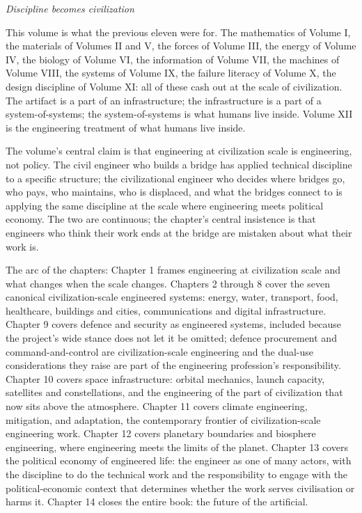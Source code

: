 
\vspace*{1.5cm}
\begin{center}
\itshape\large
Discipline becomes civilization
\end{center}
\vspace{0.5cm}

\noindent
This volume is what the previous eleven were for. The mathematics of Volume I, the materials of Volumes II and V, the forces of Volume III, the energy of Volume IV, the biology of Volume VI, the information of Volume VII, the machines of Volume VIII, the systems of Volume IX, the failure literacy of Volume X, the design discipline of Volume XI: all of these cash out at the scale of civilization. The artifact is a part of an infrastructure; the infrastructure is a part of a system-of-systems; the system-of-systems is what humans live inside. Volume XII is the engineering treatment of what humans live inside.

The volume's central claim is that engineering at civilization scale is engineering, not policy. The civil engineer who builds a bridge has applied technical discipline to a specific structure; the civilizational engineer who decides where bridges go, who pays, who maintains, who is displaced, and what the bridges connect to is applying the same discipline at the scale where engineering meets political economy. The two are continuous; the chapter's central insistence is that engineers who think their work ends at the bridge are mistaken about what their work is.

The arc of the chapters: Chapter 1 frames engineering at civilization scale and what changes when the scale changes. Chapters 2 through 8 cover the seven canonical civilization-scale engineered systems: energy, water, transport, food, healthcare, buildings and cities, communications and digital infrastructure. Chapter 9 covers defence and security as engineered systems, included because the project's wide stance does not let it be omitted; defence procurement and command-and-control are civilization-scale engineering and the dual-use considerations they raise are part of the engineering profession's responsibility. Chapter 10 covers space infrastructure: orbital mechanics, launch capacity, satellites and constellations, and the engineering of the part of civilization that now sits above the atmosphere. Chapter 11 covers climate engineering, mitigation, and adaptation, the contemporary frontier of civilization-scale engineering work. Chapter 12 covers planetary boundaries and biosphere engineering, where engineering meets the limits of the planet. Chapter 13 covers the political economy of engineered life: the engineer as one of many actors, with the discipline to do the technical work and the responsibility to engage with the political-economic context that determines whether the work serves civilisation or harms it. Chapter 14 closes the entire book: the future of the artificial.

